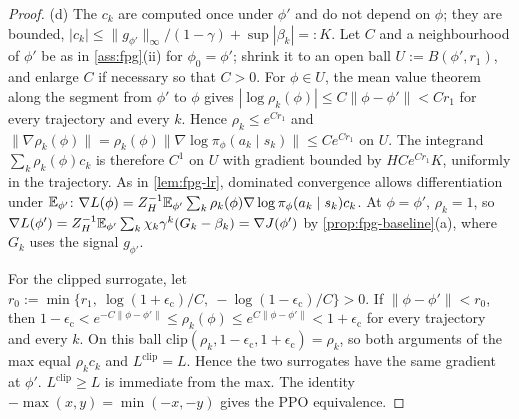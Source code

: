 \begin{proof}
(d) The $c_k$ are computed once under $\phi'$ and do not depend on $\phi$; they are bounded, $|c_k|\le\|g_{\phi'}\|_\infty/(1-\gamma)+\sup|\beta_k|=:K$.
Let $C$ and a neighbourhood of $\phi'$ be as in \cref{ass:fpg}(ii) for $\phi_0=\phi'$; shrink it to an open ball $U:=B(\phi',r_1)$, and enlarge $C$ if necessary so that $C>0$.
For $\phi\in U$, the mean value theorem along the segment from $\phi'$ to $\phi$ gives $|\log\rho_k(\phi)|\le C\|\phi-\phi'\|<Cr_1$ for every trajectory and every $k$.
Hence $\rho_k\le e^{Cr_1}$ and $\|\nabla\rho_k(\phi)\|=\rho_k(\phi)\|\nabla\log\pi_\phi(a_k\mid s_k)\|\le Ce^{Cr_1}$ on $U$.
The integrand $\sum_k\rho_k(\phi)c_k$ is therefore $C^1$ on $U$ with gradient bounded by $HCe^{Cr_1}K$, uniformly in the trajectory.
As in \cref{lem:fpg-lr}, dominated convergence allows differentiation under $\mathbb{E}_{\phi'}$:
$\nabla L(\phi)=Z_H^{-1}\mathbb{E}_{\phi'}\sum_k\rho_k(\phi)\nabla\log\pi_\phi(a_k\mid s_k)c_k$.
At $\phi=\phi'$, $\rho_k=1$, so $\nabla L(\phi')=Z_H^{-1}\mathbb{E}_{\phi'}\sum_k\chi_k\gamma^k(G_k-\beta_k)=\nabla J(\phi')$ by \cref{prop:fpg-baseline}(a), where $G_k$ uses the signal $g_{\phi'}$.

For the clipped surrogate, let $r_0:=\min\{r_1,\ \log(1+\epsilon_{\mathrm c})/C,\ -\log(1-\epsilon_{\mathrm c})/C\}>0$.
If $\|\phi-\phi'\|<r_0$, then $1-\epsilon_{\mathrm c}<e^{-C\|\phi-\phi'\|}\le\rho_k(\phi)\le e^{C\|\phi-\phi'\|}<1+\epsilon_{\mathrm c}$ for every trajectory and every $k$.
On this ball $\mathrm{clip}(\rho_k,1-\epsilon_{\mathrm c},1+\epsilon_{\mathrm c})=\rho_k$, so both arguments of the max equal $\rho_kc_k$ and $L^{\mathrm{clip}}=L$.
Hence the two surrogates have the same gradient at $\phi'$.
$L^{\mathrm{clip}}\ge L$ is immediate from the max. The identity $-\max(x,y)=\min(-x,-y)$ gives the PPO equivalence.
\end{proof}

